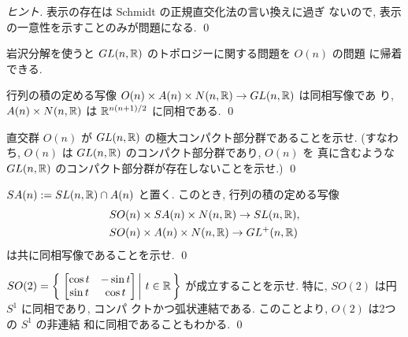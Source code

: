 \documentclass[12pt,twoside]{jarticle}
\begin{document}
\begin{proof}[ヒント]
表示の存在は Schmidt の正規直交化法の言い換えに過ぎ
ないので, 表示の一意性を示すことのみが問題になる.
\qed
\end{proof}

岩沢分解を使うと $GL(n,{\mathbb R})$ のトポロジーに関する問題を $O(n)$ の問題
に帰着できる.

\begin{question}[岩沢分解2]\label{q:Iwasawa2}
  行列の積の定める写像 %
  $O(n)\times A(n) \times N(n,{\mathbb R}) \rightarrow GL(n,{\mathbb R})$ は同相写像であ
  り, $A(n) \times N(n,{\mathbb R})$ は ${\mathbb R}^{n(n+1)/2}$ に同相である. \qed
\end{question}

\begin{question}
  直交群 $O(n)$ が $GL(n,{\mathbb R})$ の極大コンパクト部分群であることを示せ.
  (すなわち, $O(n)$ は $GL(n,{\mathbb R})$ のコンパクト部分群であり, $O(n)$ を
  真に含むような $GL(n,{\mathbb R})$ のコンパクト部分群が存在しないことを示せ.)
  \qed
\end{question}

\begin{question}[岩沢分解3]\label{q:Iwasawa3}
  $SA(n) := SL(n,{\mathbb R}) \cap A(n)$ と置く. このとき, 行列の積の定める写像 %
  \begin{align*}
  & SO(n)\times SA(n) \times N(n,{\mathbb R}) \rightarrow SL(n,{\mathbb R}),
  \\
  & SO(n)\times A(n) \times N(n,{\mathbb R}) \rightarrow GL^+(n,{\mathbb R})    
  \end{align*}
  は共に同相写像であることを示せ. \qed
\end{question}

\begin{question}
  \( \displaystyle
    SO(2)
    =
    \left\{\,
    \left.
      \begin{bmatrix} \cos t & - \sin t \\ \sin t & \cos t \end{bmatrix}
    \,\right|\,
      t \in {\mathbb R}
    \,\right\}
  \) %
  が成立することを示せ. 特に, $SO(2)$ は円 $S^1$ に同相であり, コンパ
  クトかつ弧状連結である. このことより, $O(2)$ は2つの $S^1$ の非連結
  和に同相であることもわかる. \qed
\end{question}
\end{document}
